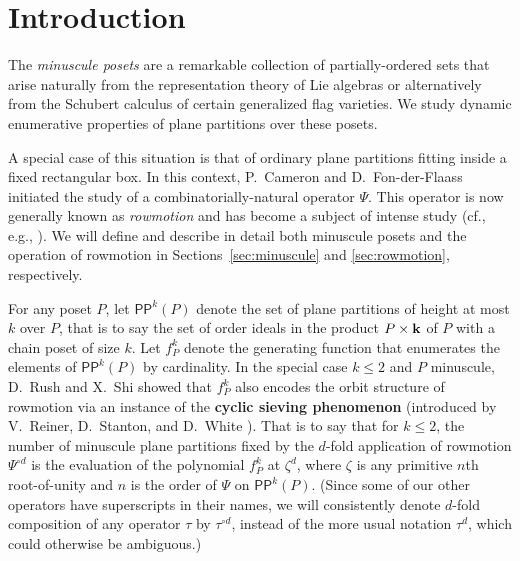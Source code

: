 \documentclass[12pt]{amsart}
\theoremstyle{definition}
\theoremstyle{remark}
\numberwithin{equation}{section}
\newcommand{\pp}{\ensuremath{\mathsf{PP}}}
\begin{document}
\maketitle


%
\section{Introduction}
%
\label{sec:introduction}

The \emph{minuscule posets} are a remarkable collection of partially-ordered sets that arise naturally from the representation theory of Lie algebras or alternatively from the Schubert calculus of certain generalized flag varieties. We study dynamic enumerative properties of plane partitions over these posets.

A special case of this situation is that of ordinary plane partitions fitting inside a fixed rectangular box. In this context, P.~Cameron and D.~Fon-der-Flaass \cite{Cameron.Fonderflaass} initiated the study of a combinatorially-natural operator $\Psi$. This operator is now generally known as \emph{rowmotion} and has become a subject of intense study (cf., e.g., \cite{Panyushev,Striker.Williams,Armstrong.Stump.Thomas,Rush.Shi,Einstein.Propp,Propp.Roby,Grinberg.Roby:2,Grinberg.Roby:1,DPS,Vorland}).
We will define and describe in detail both minuscule posets and the operation of rowmotion in Sections~\ref{sec:minuscule} and \ref{sec:rowmotion}, respectively.

For any poset $P$, let $\pp^k(P)$ denote the set of plane partitions of height at most $k$ over $P$, that is to say the set of order ideals in the product $P \times {\bf k}$ of $P$ with a chain poset of size $k$. Let $f_P^k$ denote the generating function that enumerates the elements of $\pp^k(P)$  by cardinality. In the special case $k \leq 2$ and $P$ minuscule, D.~Rush and X.~Shi \cite{Rush.Shi} showed that $f_P^k$ also encodes the orbit structure of rowmotion via an instance of the {\bf cyclic sieving phenomenon} (introduced by V.~Reiner, D.~Stanton, and D.~White \cite{Reiner.Stanton.White}). That is to say that for $k \leq 2$, the number of minuscule plane partitions fixed by the $d$-fold application of rowmotion $\Psi^{\circ d}$ is the evaluation of the polynomial $f_P^k$ at $\zeta^d$, where $\zeta$ is any primitive $n$th root-of-unity and $n$ is the order of $\Psi$ on $\pp^k(P)$. (Since some of our other operators have superscripts in their names, we will consistently denote $d$-fold composition of any operator $\tau$ by $\tau^{\circ d}$, instead of the more usual notation $\tau^d$, which could otherwise be ambiguous.)
\end{document}
